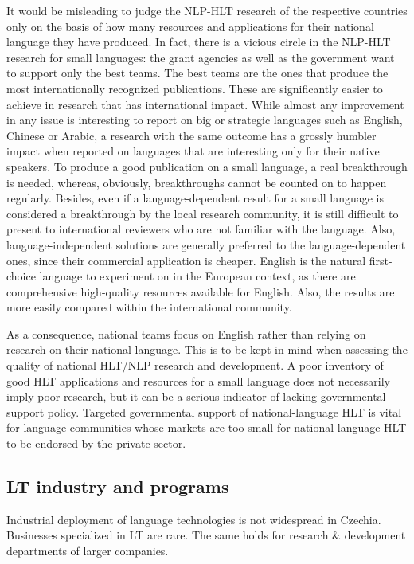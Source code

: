 \begin{multicols}{2}
It would be misleading to judge the NLP-HLT research of the respective countries only on the basis of how many resources and applications for their national language they have produced. In fact, there is a vicious circle in the NLP-HLT research for small languages: the grant agencies as well as the government want to support only the best teams. The best teams are the ones that produce the most internationally recognized publications. These are significantly easier to achieve in research that has international impact. While almost any improvement in any issue is interesting to report on big or strategic languages such as English, Chinese or Arabic, a research with the same outcome has a grossly humbler impact when reported on languages that are interesting only for their native speakers. To produce a good publication on a small language, a real breakthrough is needed, whereas, obviously, breakthroughs cannot be counted on to happen regularly.  Besides, even if a language-dependent result for a small language is considered a breakthrough by the local research community, it is still difficult to present to international reviewers who are not familiar with the language.
Also, language-independent solutions are generally preferred to the language-dependent ones, since their commercial application is cheaper. English is the natural first-choice language to experiment on in the European context, as there are comprehensive high-quality resources available for English. Also, the results are more easily compared within the international community.

As a consequence, national teams focus on English rather than relying on research on their national language. This is to be kept in mind when assessing the quality of national HLT/NLP research and development. A poor inventory of good HLT applications and resources for a small language does not necessarily imply poor research, but it can be a serious indicator of lacking governmental support policy. Targeted governmental support of national-language HLT is vital for language communities whose markets are too small for national-language HLT to be endorsed by the private sector.
 
\subsection{LT industry and programs}

Industrial deployment of language technologies is not widespread in Czechia. Businesses specialized in LT are rare. The same holds for research \& development departments of larger companies.


\end{multicols}

